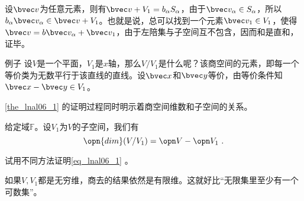 设$\bvec v$为任意元素，则有$\bvec v+V_1=b_{\alpha} S_{\alpha}$，由于$\bvec v_{\alpha}\in S_{\alpha}$，所以$b_{\alpha} \bvec v_{\alpha}\in\bvec v+V_1$。也就是说，总可以找到一个元素$\bvec v_1\in V_1$，使得$\bvec v=b\bvec v_{\alpha}+\bvec v_1$，由于左陪集与子空间互不包含，因而和是直和，证毕。
\begin{exercise}{例子}
设$V$是一个平面，$V_1$是$x$轴，那么$V/V_1$是什么呢？该商空间的元素，即每一个等价类为无数平行于该直线的直线。设$\bvec x$和$\bvec y$等价，由等价条件知$\bvec x-\bvec y\in V_1$。
\end{exercise}
\autoref{the_lnal06_1} 的证明过程同时明示着商空间维数和子空间的关系。
\begin{theorem}{}
给定域$\mathbb F$。设$V_1$为$V$的子空间，我们有
\begin{equation}\label{eq_lnal06_1}
\opn {dim}(V/V_1)=\opn V-\opn V_1~.
\end{equation}
\end{theorem}
\begin{exercise}{}
试用不同方法证明\autoref{eq_lnal06_1} 。
\end{exercise}
如果$V,V_1$都是无穷维，商去的结果依然是有限维。这就好比“无限集里至少有一个可数集”。
